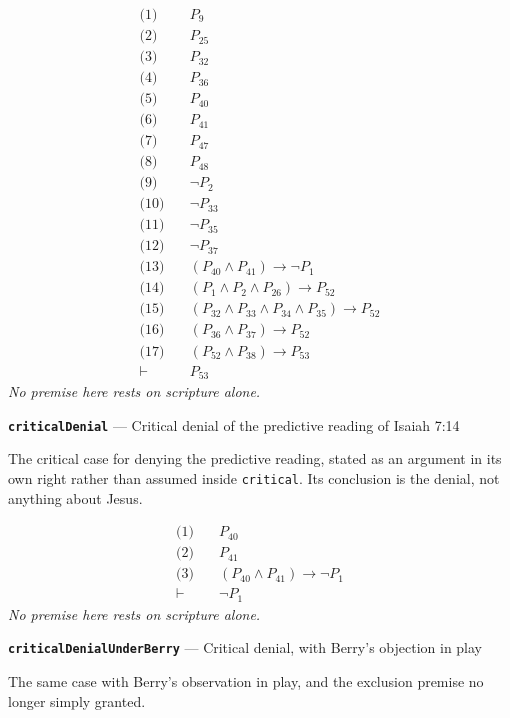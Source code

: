 \documentclass[11pt]{article}
\begin{document}
\begin{align*}
  \text{(1)} \quad & P_{9} \\
  \text{(2)} \quad & P_{25} \\
  \text{(3)} \quad & P_{32} \\
  \text{(4)} \quad & P_{36} \\
  \text{(5)} \quad & P_{40} \\
  \text{(6)} \quad & P_{41} \\
  \text{(7)} \quad & P_{47} \\
  \text{(8)} \quad & P_{48} \\
  \text{(9)} \quad & \lnot P_{2} \\
  \text{(10)} \quad & \lnot P_{33} \\
  \text{(11)} \quad & \lnot P_{35} \\
  \text{(12)} \quad & \lnot P_{37} \\
  \text{(13)} \quad & (P_{40} \land P_{41}) \rightarrow \lnot P_{1} \\
  \text{(14)} \quad & (P_{1} \land P_{2} \land P_{26}) \rightarrow P_{52} \\
  \text{(15)} \quad & (P_{32} \land P_{33} \land P_{34} \land P_{35}) \rightarrow P_{52} \\
  \text{(16)} \quad & (P_{36} \land P_{37}) \rightarrow P_{52} \\
  \text{(17)} \quad & (P_{52} \land P_{38}) \rightarrow P_{53} \\
  \vdash \quad & P_{53}
\end{align*}
\emph{No premise here rests on scripture alone.}
\par\medskip\noindent\textbf{\texttt{critical\allowbreak{}Denial}} --- Critical denial of the predictive reading of Isaiah 7:14\par\nobreak\noindent
The critical case for denying the predictive reading, stated as an argument in its own right rather than assumed inside \texttt{critical}. Its conclusion is the denial, not anything about Jesus.

\begin{align*}
  \text{(1)} \quad & P_{40} \\
  \text{(2)} \quad & P_{41} \\
  \text{(3)} \quad & (P_{40} \land P_{41}) \rightarrow \lnot P_{1} \\
  \vdash \quad & \lnot P_{1}
\end{align*}
\emph{No premise here rests on scripture alone.}
\par\medskip\noindent\textbf{\texttt{critical\allowbreak{}Denial\allowbreak{}Under\allowbreak{}Berry}} --- Critical denial, with Berry's objection in play\par\nobreak\noindent
The same case with Berry's observation in play, and the exclusion premise no longer simply granted.
\end{document}
